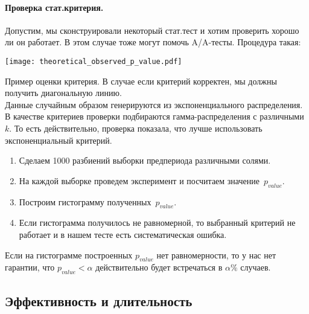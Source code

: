 \documentclass[../handbook.tex]{subfiles}
\begin{document}
\paragraph{Проверка стат.критерия.}
Допустим, мы сконструировали некоторый
стат.тест и хотим проверить хорошо ли он работает. В этом случае тоже могут
помочь A\slash A-тесты. Процедура такая:
\begin{marginfigure}
    \texttt{[image: theoretical\_observed\_p\_value.pdf]}
    \caption{Пример оценки критерия. В случае если критерий корректен, мы
        должны получить диагональную линию. \\
        Данные случайным образом генерируются из экспоненциального
        распределения. В качестве критериев проверки подбираются
        гамма-распределения с различными~$k$. То есть действительно, проверка
        показала, что лучше использовать экспоненциальный критерий.
    }
\end{marginfigure}
\begin{enumerate}
    \item Сделаем 1000 разбиений выборки предпериода различными солями.
    \item На каждой выборке проведем эксперимент и посчитаем значение~$p_{value}$.
    \item Построим гистограмму полученных~$p_{value}$.
    \item Если гистограмма получилось не равномерной, то выбранный критерий не работает и в нашем тесте есть систематическая ошибка. 
\end{enumerate}

Если на гистограмме построенных $p_{value}$ нет равномерности, то у нас нет
гарантии, что $p_{value} < \alpha$ действительно будет встречаться в $\alpha\%$
случаев.

\subsection{Эффективность и длительность}
\end{document}
